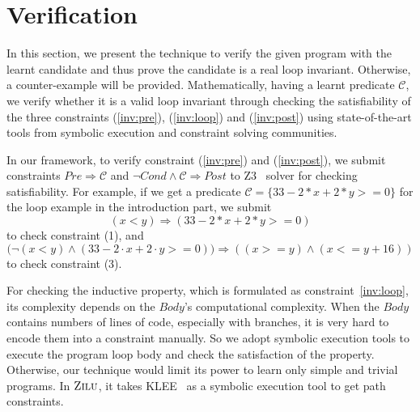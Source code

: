 
\section{Verification} %
\label{sec:verification}
In this section, we present the technique to verify the given program with the learnt candidate
and thus prove the candidate is a real loop invariant.
Otherwise, a counter-example will be provided.
Mathematically, having a learnt predicate $\mathcal{C}$, we verify whether it is a valid loop invariant through
checking the satisfiability of the three constraints (\ref{inv:pre}), (\ref{inv:loop}) and (\ref{inv:post}) 
using state-of-the-art tools from symbolic execution and constraint solving communities.

In our framework, to verify constraint (\ref{inv:pre}) and (\ref{inv:post}), 
we submit constraints $Pre \Rightarrow \mathcal{C}$ 
and $\neg {Cond} \wedge \mathcal{C} \Rightarrow Post$
to Z3~\cite{de2008z3} solver for checking satisfiability.
For example, if we get a predicate $\mathcal{C} = \{33-2*x+2*y>=0\}$
for the loop example in the introduction part, 
we submit 
$$(x<y) \Rightarrow (33-2*x+2*y>=0)$$
to check constraint (1), and 
$$\big(\neg(x<y) \wedge (33-2\cdot x+2\cdot y>=0)\big) \Rightarrow ((x >= y) \wedge (x <= y + 16))$$
to check constraint (3).

For checking the inductive property, which is formulated as constraint~\ref{inv:loop},
its complexity depends on the $Body$'s computational complexity.
When the $Body$ contains numbers of lines of code, especially with branches, 
it is very hard to encode them into a constraint manually.
So we adopt symbolic execution tools to execute the program loop body 
and check the satisfaction of the property. 
Otherwise, our technique would limit its power to learn only simple and trivial programs. 
In $\textsc{Zilu}$, it takes KLEE~\cite{cadar2008klee} as a symbolic execution tool to get path constraints.

